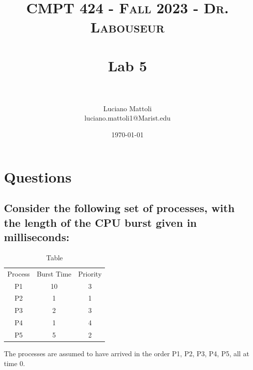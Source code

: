 \documentclass[letterpaper, 10pt,DIV=13]{scrartcl}
\title{	
   \normalfont \normalsize 
   \textsc{CMPT 424 - Fall 2023 - Dr. Labouseur} \\[10pt] %
   \horrule{0.5pt} \\[0.25cm] 	%
   \huge Lab 5  \\     	    %
   \horrule{0.5pt} \\[0.25cm] 	%
}
\author{Luciano Mattoli \\ \normalsize luciano.mattoli1@Marist.edu}
\date{\normalsize\today} 	%
\numberwithin{equation}{section} %
\numberwithin{figure}{section} %
\numberwithin{table}{section} %
\begin{document}
\maketitle %

\section{Questions}

\subsection{Consider the following set of processes, with the length of the CPU burst given in milliseconds:}

\begin{table}
    \centering
    \begin{tabular}{ccc}
         Process&  Burst Time& Priority\\
         P1&  10& 3\\
         P2&  1& 1\\
         P3&  2& 3\\
         P4&  1& 4\\
         P5&  5& 2\\
    \end{tabular}
    \caption{Table}
    \label{tab:my_label}
\end{table}
The processes are assumed to have arrived in the order P1, P2, P3, P4, P5, all at time 0.
\end{document}
